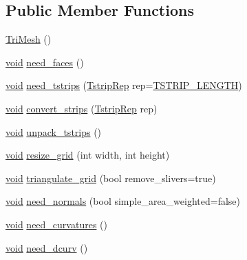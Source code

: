 \subsection*{Public Member Functions}
\begin{DoxyCompactItemize}
\item 
\hyperlink{classtrimesh_1_1TriMesh_a881258883bf92bddaafe75cff80c0518}{Tri\+Mesh} ()
\item 
\hyperlink{namespacetrimesh_a784ddfd979e1c579bda795a8edfc3f43}{void} \hyperlink{classtrimesh_1_1TriMesh_a572f3bf7bd1079fbdb60f5bb39a41492}{need\+\_\+faces} ()
\item 
\hyperlink{namespacetrimesh_a784ddfd979e1c579bda795a8edfc3f43}{void} \hyperlink{classtrimesh_1_1TriMesh_ad9735acb2764a2ab28b50368a86d5609}{need\+\_\+tstrips} (\hyperlink{classtrimesh_1_1TriMesh_aff9bc745211e506ed76f7756b43cd114}{Tstrip\+Rep} rep=\hyperlink{classtrimesh_1_1TriMesh_aff9bc745211e506ed76f7756b43cd114a61a016628fabaabc7d281e59c226ab57}{T\+S\+T\+R\+I\+P\+\_\+\+L\+E\+N\+G\+TH})
\item 
\hyperlink{namespacetrimesh_a784ddfd979e1c579bda795a8edfc3f43}{void} \hyperlink{classtrimesh_1_1TriMesh_a5216dbb4915371b21e751b55388bdb45}{convert\+\_\+strips} (\hyperlink{classtrimesh_1_1TriMesh_aff9bc745211e506ed76f7756b43cd114}{Tstrip\+Rep} rep)
\item 
\hyperlink{namespacetrimesh_a784ddfd979e1c579bda795a8edfc3f43}{void} \hyperlink{classtrimesh_1_1TriMesh_ae869c05ddc0526527a6c792c93140de6}{unpack\+\_\+tstrips} ()
\item 
\hyperlink{namespacetrimesh_a784ddfd979e1c579bda795a8edfc3f43}{void} \hyperlink{classtrimesh_1_1TriMesh_acae72d18d50be876554d1d7780766e1d}{resize\+\_\+grid} (int width, int height)
\item 
\hyperlink{namespacetrimesh_a784ddfd979e1c579bda795a8edfc3f43}{void} \hyperlink{classtrimesh_1_1TriMesh_a83de4d0b51cee189c95db6238dddc3cf}{triangulate\+\_\+grid} (bool remove\+\_\+slivers=true)
\item 
\hyperlink{namespacetrimesh_a784ddfd979e1c579bda795a8edfc3f43}{void} \hyperlink{classtrimesh_1_1TriMesh_af054bdc872873245f640cd545155ecb2}{need\+\_\+normals} (bool simple\+\_\+area\+\_\+weighted=false)
\item 
\hyperlink{namespacetrimesh_a784ddfd979e1c579bda795a8edfc3f43}{void} \hyperlink{classtrimesh_1_1TriMesh_a36a182d23184c10de8a594e0a5968f9f}{need\+\_\+curvatures} ()
\item 
\hyperlink{namespacetrimesh_a784ddfd979e1c579bda795a8edfc3f43}{void} \hyperlink{classtrimesh_1_1TriMesh_a42bb868fc0fa13643520084f50579a52}{need\+\_\+dcurv} ()

\end{DoxyCompactItemize}
